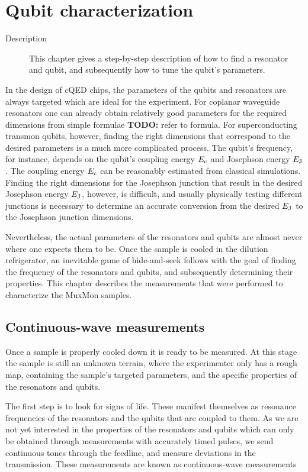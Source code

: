   \chapter{Qubit characterization}
    \begin{description}
     \item[Description] This chapter gives a step-by-step description of how to find a resonator and qubit, and subsequently how to tune the qubit's parameters.
     \end{description}

    In the design of cQED chips, the parameters of the qubits and resonators are always targeted which are ideal for the experiment.
    For coplanar waveguide resonators one can already obtain relatively good parameters for the required dimensions from simple formulae \textbf{TODO:} refer to formula.
    For superconducting transmon qubits, however, finding the right dimensions that correspond to the desired parameters is a much more complicated process.
    The qubit's frequency, for instance, depends on the qubit's coupling energy $E_\text{c}$ and Josephson energy $E_\text{J}$. The coupling energy $E_\text{c}$ can be reasonably estimated from classical simulations. Finding the right dimensions for the Josephson junction that result in the desired Josephson energy $E_\text{J}$, however, is difficult, and usually physically testing different junctions is necessary to determine an accurate conversion from the desired $E_\text{J}$ to the Josephson junction dimensions.

    Nevertheless, the actual parameters of the resonators and qubits are almost never where one expects them to be. Once the sample is cooled in the dilution refrigerator, an inevitable game of hide-and-seek follows with the goal of finding the frequency of the resonators and qubits, and subsequently determining their properties. This chapter describes the measurements that were performed to characterize the MuxMon samples.

    \section{Continuous-wave measurements}

      Once a sample is properly cooled down it is ready to be measured. At this stage the sample is still an unknown terrain, where the experimenter only has a rough map, containing the sample's targeted parameters, and the specific properties of the resonators and qubits.

      The first step is to look for signs of life. These manifest themselves as resonance frequencies of the resonators and the qubits that are coupled to them. As we are not yet interested in the properties of the resonators and qubits which can only be obtained through measurements with accurately timed pulses, we send continuous tones through the feedline, and measure deviations in the transmission. These measurements are known as continuous-wave measurements

